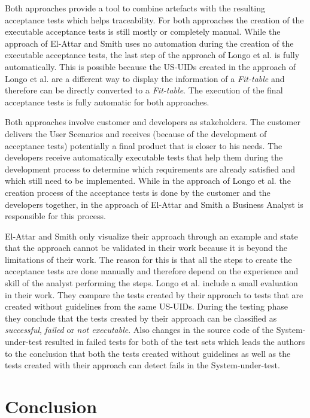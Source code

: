 Both approaches provide a tool to combine artefacts with the resulting acceptance tests which helps traceability.
For both approaches the creation of the executable acceptance tests is still mostly or completely manual.
While the approach of El-Attar and Smith uses no automation during the creation of the executable acceptance tests, the last step of the approach of Longo et al. is fully automatically.
This is possible because the US-UIDs created in the approach of Longo et al. are a different way to display the information of a \textit{Fit-table} and therefore can be directly converted to a \textit{Fit-table}.
The execution of the final acceptance tests is fully automatic for both approaches.

Both approaches involve customer and developers as stakeholders.
The customer delivers the User Scenarios and receives (because of the development of acceptance tests) potentially a final product that is closer to his needs.
The developers receive automatically executable tests that help them during the development process to determine which requirements are already satisfied and which still need to be implemented.
While in the approach of Longo et al. the creation process of the acceptance tests is done by the customer and the developers together, in the approach of El-Attar and Smith a Business Analyst is responsible for this process.

El-Attar and Smith only visualize their approach through an example and state that the approach cannot be validated in their work because it is beyond the limitations of their work.
The reason for this is that all the steps to create the acceptance tests are done manually and therefore depend on the experience and skill of the analyst performing the steps.
Longo et al. include a small evaluation in their work.
They compare the tests created by their approach to tests that are created without guidelines from the same US-UIDs.
During the testing phase they conclude that the tests created by their approach can be classified as \textit{successful}, \textit{failed} or \textit{not executable}.
Also changes in the source code of the System-under-test resulted in failed tests for both of the test sets which leads the authors to the conclusion that both the tests created without guidelines as well as the tests created with their approach can detect fails in the System-under-test.


\section{Conclusion}
\label{sec:topic_2_conclusion}

